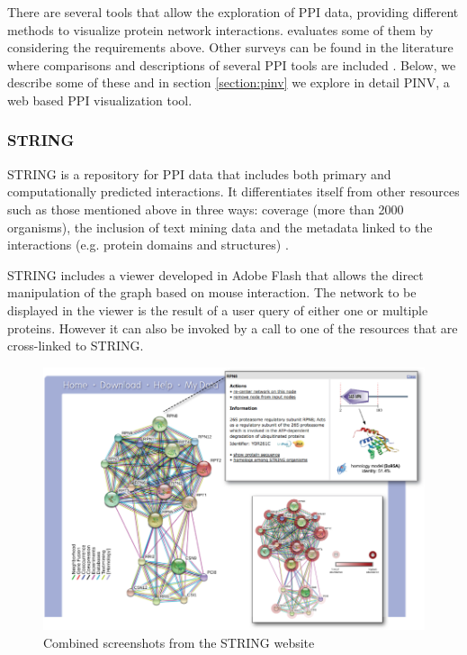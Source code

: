 There are several tools that allow the exploration of PPI data, providing different methods to visualize protein network interactions. \cite{AGA2013} evaluates some of them by considering the requirements above. Other surveys can be found in the literature where comparisons and descriptions of several PPI tools are included \cite{SUD2007, PAV2008, GEH2010}. Below, we describe some of these and in section \ref{section:pinv} we explore in detail PINV, a web based PPI visualization tool. 

\subsubsection{STRING}
STRING is a repository for PPI data that includes both primary and computationally predicted interactions. It differentiates itself from other resources such as those mentioned above in three ways: coverage (more than 2000 organisms), the inclusion of text mining data and the metadata linked to the interactions (e.g. protein domains and structures) \cite{FRA2013}.

STRING includes a viewer developed in Adobe Flash that allows the direct manipulation of the graph based on mouse interaction. The network to be displayed in the viewer is the result of a user query of either one or multiple proteins. However it can also be invoked by a call to one of the resources that are cross-linked to STRING.

\begin{figure}  
\centering
\includegraphics[width=\textwidth]{figures/string.png}
\caption[STRING Snapshot.]{Combined screenshots from the STRING website
\label{fig:string}}
\end{figure}

